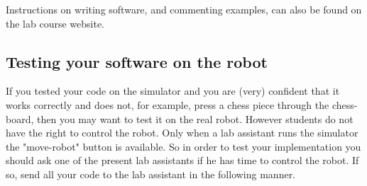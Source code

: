 \documentclass[10pt]{scrartcl}
\begin{document}
Instructions on writing software, and commenting examples, can also be found on the lab course website.

%
%
%
%

\subsection{Testing your software on the robot}
If you tested your code on the simulator and you are (very) confident
that it works correctly and does not, for example, press a chess piece
through the chess-board, then you may want to test it on the real robot.
However students do not have the right to control the robot. Only when a
lab assistant runs the simulator the "move-robot" button is available.
So in order to test your implementation you should ask one of the
present lab assistants if he has time to control the robot. If so, send
all your code to the lab assistant in the following manner.
\end{document}
